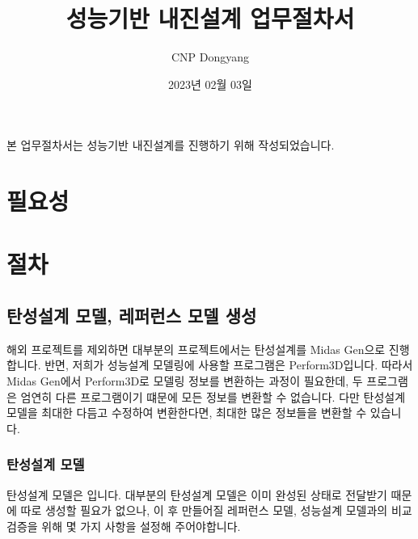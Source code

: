 \documentclass[a4paper,10pt,korean]{sphinxmanual}
\title{성능기반 내진설계 업무절차서}
\date{2023년 02월 03일}
\author{CNP Dongyang}
\begin{document}
\pagestyle{empty}
\sphinxmaketitle
\pagestyle{plain}
\sphinxtableofcontents
\pagestyle{normal}
\label{\detokenize{pbd_p3d_manual::doc}}


\sphinxAtStartPar
본 업무절차서는 성능기반 내진설계를  진행하기 위해 작성되었습니다.


\chapter{필요성}
\label{\detokenize{pbd_p3d_manual:id1}}

\chapter{절차}
\label{\detokenize{pbd_p3d_manual:id2}}
\sphinxstepscope


\section{탄성설계 모델, 레퍼런스 모델 생성}
\label{\detokenize{1_ref_model:id1}}\label{\detokenize{1_ref_model::doc}}
\sphinxAtStartPar
{}

\sphinxAtStartPar
해외 프로젝트를 제외하면 대부분의 프로젝트에서는 탄성설계를 Midas Gen으로 진행합니다. 반면, 저희가 성능설계 모델링에 사용할 프로그램은 Perform\sphinxhyphen{}3D입니다.
따라서 Midas Gen에서 Perform\sphinxhyphen{}3D로 모델링 정보를 변환하는 과정이 필요한데, 두 프로그램은 엄연히 다른 프로그램이기 떄문에 모든 정보를 변환할 수 없습니다.
다만 탄성설계 모델을 최대한 다듬고 수정하여 변환한다면, 최대한 많은 정보들을 변환할 수 있습니다.

\begin{figure}[htbp]
\centering
\capstart

\noindent{}
\caption{}\label{\detokenize{1_ref_model:id5}}\end{figure}


\subsection{탄성설계 모델}
\label{\detokenize{1_ref_model:id2}}
\sphinxAtStartPar
탄성설계 모델은  입니다.
대부분의 탄성설계 모델은 이미 완성된 상태로 전달받기 때문에 따로 생성할 필요가 없으나,
이 후 만들어질 레퍼런스 모델, 성능설계 모델과의 비교 검증을 위해 몇 가지 사항을 설정해 주어야합니다.
\end{document}
